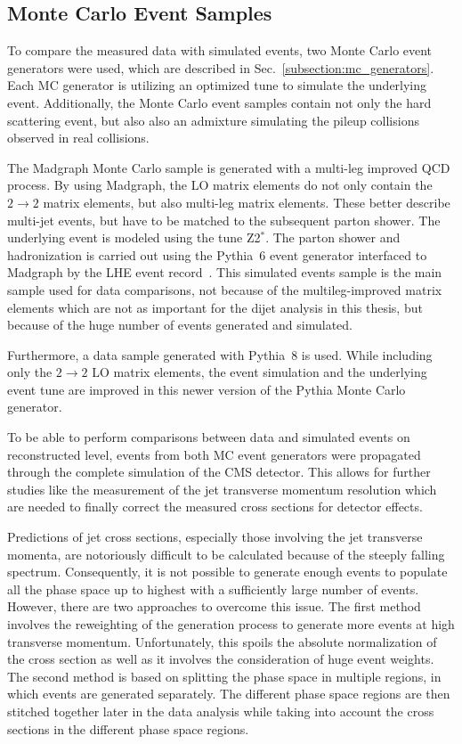 \subsection{Monte Carlo Event Samples}

To compare the measured data with simulated events, two
Monte Carlo event generators were used, which are described in
Sec.~\ref{subsection:mc_generators}. Each MC generator is utilizing an optimized
tune to simulate the underlying event. Additionally, the Monte Carlo event samples
contain not only the hard scattering event, but also also an admixture
simulating the pileup collisions observed in real collisions.

The Madgraph Monte Carlo sample is generated with a multi-leg improved QCD
process. By using Madgraph, the LO matrix elements do not only contain the $2
\rightarrow 2$ matrix elements, but also multi-leg matrix elements. These better
describe multi-jet events, but have to be matched to the subsequent parton
shower. The underlying event is modeled using the tune Z2$^*$. The parton shower
and hadronization is carried out using the Pythia~6 event generator interfaced
to Madgraph by the LHE event record~\cite{Alwall:2006yp}. This simulated events
sample is the main sample used for data comparisons, not because of the
multileg-improved matrix elements which are not as important for the dijet
analysis in this thesis, but because of the huge number of events generated and simulated.

Furthermore, a data sample generated with Pythia~8 is used. While including only the $2
\rightarrow 2$ LO matrix elements, the event simulation and the underlying event
tune are improved in this newer version of the Pythia Monte Carlo generator.

To be able to perform comparisons between data and simulated events on
reconstructed level, events from both MC event generators were propagated
through the complete simulation of the CMS detector. This allows for further
studies like the measurement of the jet transverse momentum resolution which are
needed to finally correct the measured cross sections for detector effects.

Predictions of jet cross sections, especially those involving the jet transverse
momenta, are notoriously difficult to be calculated because of the steeply
falling spectrum. Consequently, it is not possible to generate enough events to
populate all the phase space up to highest \pt with a sufficiently large
number of events. However, there are two approaches to overcome this issue.
The first method involves the reweighting of the generation process to generate
more events at high transverse momentum. Unfortunately, this spoils the absolute
normalization of the cross section as well as it involves the consideration of
huge event weights. The second method is based on splitting the phase space in
multiple regions, in which events are generated separately. The different phase
space regions are then stitched together later in the data analysis while taking
into account the cross sections in the different phase space regions. 

